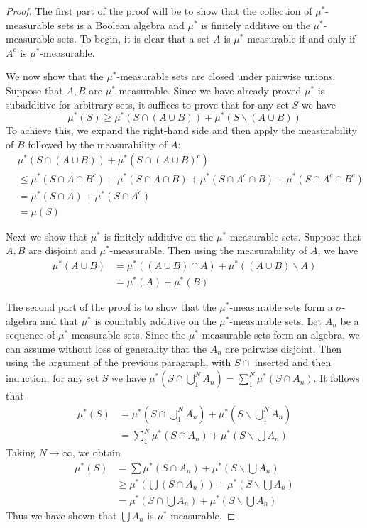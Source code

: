 \documentclass[11pt,oneside]{amsbook}
\renewcommand{\setminus}{\smallsetminus}
\theoremstyle{definition}
\theoremstyle{plain}
\theoremstyle{definition}
\theoremstyle{remark}
\numberwithin{equation}{section}
\numberwithin{figure}{section}
\begin{document}
\begin{proof}
  The first part of the proof will be to show that the collection of $\mu^*$-measurable sets is a Boolean algebra and $\mu^*$ is finitely additive on the $\mu^*$-measurable sets. To begin, it is clear that a set $A$ is $\mu^*$-measurable if and only if $A^c$ is $\mu^*$-measurable.

  We now show that the $\mu^*$-measurable sets are closed under pairwise unions. Suppose that $A,B$ are $\mu^*$-measurable. Since we have already proved $\mu^*$ is subadditive for arbitrary sets, it suffices to prove that for any set $S$ we have
  \[\mu^*(S)\geq\mu^*(S\cap(A\cup B))+\mu^*(S\setminus(A\cup B))
  \]
  To achieve this, we expand the right-hand side and then apply the measurability of $B$ followed by the measurability of $A$:
  \begin{align*}
    &\mu^*(S\cap(A\cup B))+\mu^*(S\cap(A\cup B)^c)\\
    &\leq \mu^*(S\cap A\cap B^c)+\mu^*(S\cap A\cap B)+\mu^*(S\cap A^c\cap B)+\mu^*(S\cap A^c\cap B^c)\\
    &=\mu^*(S\cap A)+\mu^*(S\cap A^c)\\
    &=\mu(S)
  \end{align*}
  
  Next we show that $\mu^*$ is finitely additive on the $\mu^*$-measurable sets. Suppose that $A,B$ are disjoint and $\mu^*$-measurable. Then using the measurability of $A$, we have
  \begin{align*}
    \mu^*(A\cup B)&=\mu^*((A\cup B)\cap A)+\mu^*((A\cup B)\setminus A)\\
                  &=\mu^*(A)+\mu^*(B)
  \end{align*}

  The second part of the proof is to show that the $\mu^*$-measurable sets form a $\sigma$-algebra and that $\mu^*$ is countably additive on the $\mu^*$-measurable sets. Let $A_n$ be a sequence of $\mu^*$-measurable sets. Since the $\mu^*$-measurable sets form an algebra, we can assume without loss of generality that the $A_n$ are pairwise disjoint. Then using the argument of the previous paragraph, with $S\cap$ inserted and then induction, for any set $S$ we have $\mu^*(S\cap\bigcup_1^N A_n)=\sum_1^N\mu^*(S\cap A_n)$. It follows that
  \begin{align*}
    \mu^*(S)&=\mu^*(S\cap\bigcup_1^N A_n)+\mu^*(S\setminus\bigcup_1^N A_n)\\
            &=\sum_1^N\mu^*(S\cap A_n)+\mu^*(S\setminus\bigcup A_n)
  \end{align*}
  Taking $N\to\infty$, we obtain
  \begin{align*}
    \mu^*(S)&=\sum\mu^*(S\cap A_n)+\mu^*(S\setminus\bigcup A_n)\\
            &\geq\mu^*(\bigcup (S\cap A_n))+\mu^*(S\setminus\bigcup A_n)\\
            &=\mu^*(S\cap\bigcup A_n)+\mu^*(S\setminus\bigcup A_n)
  \end{align*}
  Thus we have shown that $\bigcup A_n$ is $\mu^*$-measurable.


\end{proof}
\end{document}

